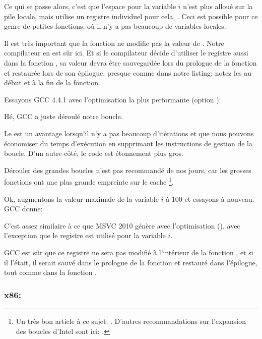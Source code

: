Ce qui se passe alors, c'est que l'espace pour la variable $i$ n'est plus alloué
sur la pile locale, mais utilise un registre individuel pour cela, \ESI. Ceci est
possible pour ce genre de petites fonctions, où il n'y a pas beaucoup de variables
locales.

Il est très important que la fonction \ttf ne modifie pas la valeur de \ESI.
Notre compilateur en est sûr ici.
Et si le compilateur décide d'utiliser le registre \ESI aussi dans la fonction \ttf,
sa valeur devra être sauvegardée lors du prologue de la fonction et restaurée lors
de son épilogue, presque comme dans notre listing: notez les 
au début et à la fin de la fonction.

Essayons GCC 4.4.1 avec l'optimisation la plus performante (option \Othree):




Hé, GCC a juste déroulé notre boucle.

Le  est un avantage lorsqu'il n'y a pas
beaucoup d'itérations et que nous pouvons économiser du temps d'exécution en supprimant
les instructions de gestion de la boucle.
D'un autre côté, le code est étonnement plus gros.

Dérouler des grandes boucles n'est pas recommandé de nos jours, car les grosses fonctions
ont une plus grande empreinte sur le cache%
%
\footnote{Un très bon article à ce sujet: \DrepperMemory.
D'autres recommandations sur l'expansion des boucles d'Intel sont ici:
.}.

Ok, augmentons la valeur maximale de la variable $i$ à 100 et essayons à nouveau.
GCC donne:



C'est assez similaire à ce que MSVC 2010 génère avec l'optimisation (\Ox), avec l'exception
que le registre \EBX est utilisé pour la variable $i$.

GCC est sûr que ce registre ne sera pas modifié à l'intérieur de la fonction \ttf,
et si il l'était, il serait sauvé dans le prologue de la fonction et restauré dans
l'épilogue, tout comme dans la fonction \main.

\clearpage
\subsubsection{x86: \olly}
\myindex{\olly}

